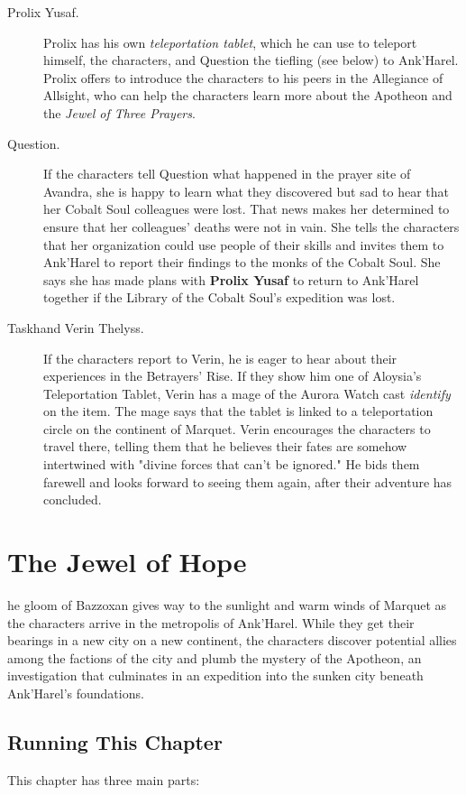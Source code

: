 \documentclass[10pt,a4paper,twoside,bg=print,twocolumn,openany,nodeprecatedcode]{dndbook}
\begin{document}
\begin{description}
\item[Prolix Yusaf.]
Prolix has his own \textit{teleportation tablet}, which he can use to teleport himself, the characters, and Question the tiefling (see below) to Ank'Harel. Prolix offers to introduce the characters to his peers in the Allegiance of Allsight, who can help the characters learn more about the Apotheon and the \textit{Jewel of Three Prayers}.
\item[Question.]
If the characters tell Question what happened in the prayer site of Avandra, she is happy to learn what they discovered but sad to hear that her Cobalt Soul colleagues were lost. That news makes her determined to ensure that her colleagues' deaths were not in vain. She tells the characters that her organization could use people of their skills and invites them to Ank'Harel to report their findings to the monks of the Cobalt Soul. She says she has made plans with \textbf{Prolix Yusaf} to return to Ank'Harel together if the Library of the Cobalt Soul's expedition was lost.
\item[Taskhand Verin Thelyss.]
If the characters report to Verin, he is eager to hear about their experiences in the Betrayers' Rise. If they show him one of Aloysia's Teleportation Tablet, Verin has a mage of the Aurora Watch cast \textit{identify} on the item. The mage says that the tablet is linked to a teleportation circle on the continent of Marquet. Verin encourages the characters to travel there, telling them that he believes their fates are somehow intertwined with "divine forces that can't be ignored." He bids them farewell and looks forward to seeing them again, after their adventure has concluded.
\end{description}

\chapter{The Jewel of Hope}
he gloom of Bazzoxan gives way to the sunlight and warm winds of Marquet as the characters arrive in the metropolis of Ank'Harel. While they get their bearings in a new city on a new continent, the characters discover potential allies among the factions of the city and plumb the mystery of the Apotheon, an investigation that culminates in an expedition into the sunken city beneath Ank'Harel's foundations.


\section{Running This Chapter}
This chapter has three main parts:
\end{document}
